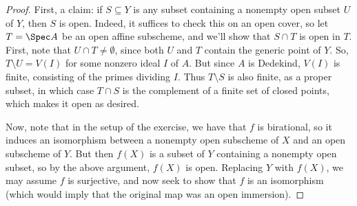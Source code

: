 \begin{proof}
	First, a claim: if $S \subseteq Y$ is any subset containing a nonempty open subset $U$ of $Y$, then $S$ is open. Indeed, it suffices to check this on an open cover, so let $T = \Spec A$ be an open affine subscheme, and we'll show that $S \cap T$ is open in $T$. First, note that $U \cap T \neq \emptyset$, since both $U$ and $T$ contain the generic point of $Y$. So, $T \setminus U = V(I)$ for some nonzero ideal $I$ of $A$. But since $A$ is Dedekind, $V(I)$ is finite, consisting of the primes dividing $I$. Thus $T \setminus S$ is also finite, as a proper subset, in which case $T \cap S$ is the complement of a finite set of closed points, which makes it open as desired.
	
	Now, note that in the setup of the exercise, we have that $f$ is birational, so it induces an isomorphism between a nonempty open subscheme of $X$ and an open subscheme of $Y$. But then $f(X)$ is a subset of $Y$ containing a nonempty open subset, so by the above argument, $f(X)$ is open. Replacing $Y$ with $f(X)$, we may assume $f$ is surjective, and now seek to show that $f$ is an isomorphism (which would imply that the original map was an open immersion).
	
	
\end{proof}

